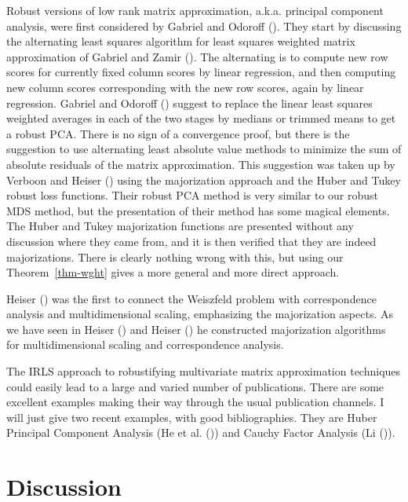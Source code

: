 \documentclass[
  12pt,
  letterpaper,
  DIV=11,
  numbers=noendperiod]{scrartcl}
\newcommand{\sectionbreak}{\pagebreak}
\theoremstyle{definition}
\theoremstyle{plain}
\theoremstyle{plain}
\theoremstyle{plain}
\theoremstyle{definition}
\theoremstyle{remark}
\begin{document}
Robust versions of low rank matrix approximation, a.k.a. principal
component analysis, were first considered by Gabriel and Odoroff
(). They start by discussing the
alternating least squares algorithm for least squares weighted matrix
approximation of Gabriel and Zamir
(). The alternating is to compute
new row scores for currently fixed column scores by linear regression,
and then computing new column scores corresponding with the new row
scores, again by linear regression. Gabriel and Odoroff
() suggest to replace the linear
least squares weighted averages in each of the two stages by medians or
trimmed means to get a robust PCA. There is no sign of a convergence
proof, but there is the suggestion to use alternating least absolute
value methods to minimize the sum of absolute residuals of the matrix
approximation. This suggestion was taken up by Verboon and Heiser
() using the majorization approach
and the Huber and Tukey robust loss functions. Their robust PCA method
is very similar to our robust MDS method, but the presentation of their
method has some magical elements. The Huber and Tukey majorization
functions are presented without any discussion where they came from, and
it is then verified that they are indeed majorizations. There is clearly
nothing wrong with this, but using our Theorem~\ref{thm-wght} gives a
more general and more direct approach.

Heiser () was the first to connect the
Weiszfeld problem with correspondence analysis and multidimensional
scaling, emphasizing the majorization aspects. As we have seen in Heiser
() and Heiser
() he constructed majorization algorithms
for multidimensional scaling and correspondence analysis.

The IRLS approach to robustifying multivariate matrix approximation
techniques could easily lead to a large and varied number of
publications. There are some excellent examples making their way through
the usual publication channels. I will just give two recent examples,
with good bibliographies. They are Huber Principal Component Analysis
(He et al. ()) and Cauchy Factor
Analysis (Li ()).

\sectionbreak

\section{Discussion}\label{discussion}
\end{document}
